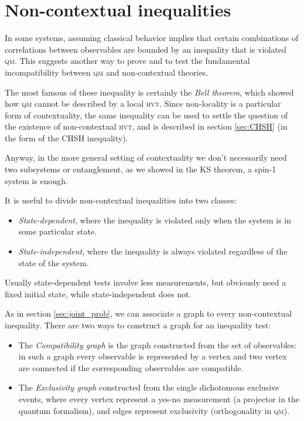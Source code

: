 \documentclass[a4paper]{article}
\newcommand{\acron}[1]{\textsc{#1}}
\newcommand{\HVT}{\acron{hvt}}
\newcommand{\QM}{\acron{qm}}
\theoremstyle{definition}
\begin{document}
\section{Non-contextual inequalities}
In some systems, assuming classical
behavior implies that certain combinations of correlations between observables
are bounded by an inequality that is violated \QM{}.
This suggests another way to prove and to test the fundamental
incompatibility between \QM{} and non-contextual theories.

The most famous of these inequality is certainly the \emph{Bell theorem}, which
showed how \QM{} cannot be described by a local \HVT{}.  Since non-locality is a
particular form of contextuality, the same inequality can be used to settle the
question of the existence of non-contextual \HVT{}, and is described in section
\ref{sec:CHSH} (in the form of the \acron{CHSH} inequality).

Anyway, in the more general setting of contextuality we don't necessarily need two
subsystems or entanglement, as we showed in the KS theorem, a spin-1 system is enough.

It is useful to divide non-contextual inequalities into two classes:
\begin{itemize}
    \item \emph{State-dependent}, where the inequality is violated only when the
        system is in some particular state.
    \item \emph{State-independent}, where the inequality is always violated
        regardless of the state of the system.
\end{itemize}
Usually state-dependent tests involve less measurements, but obviously need a
fixed initial state, while state-independent does not.

As in section \ref{sec:joint_prob}, we can associate a graph to every
non-contextual inequality.
There are two ways to construct a graph for an inequality test: 
\begin{itemize}
    \item The \emph{Compatibility graph} is the graph constructed from the set of observables: in such a
        graph every observable is represented by a vertex and two vertex are
        connected if the corresponding observables are compatible.
    \item The \emph{Exclusivity graph} constructed from the single dichotomous exclusive events,
        where every vertex represent a yes-no measurement (a projector in the
        quantum formalism), and edges represent exclusivity (orthogonality in
        \QM{}).
\end{itemize}
\end{document}
